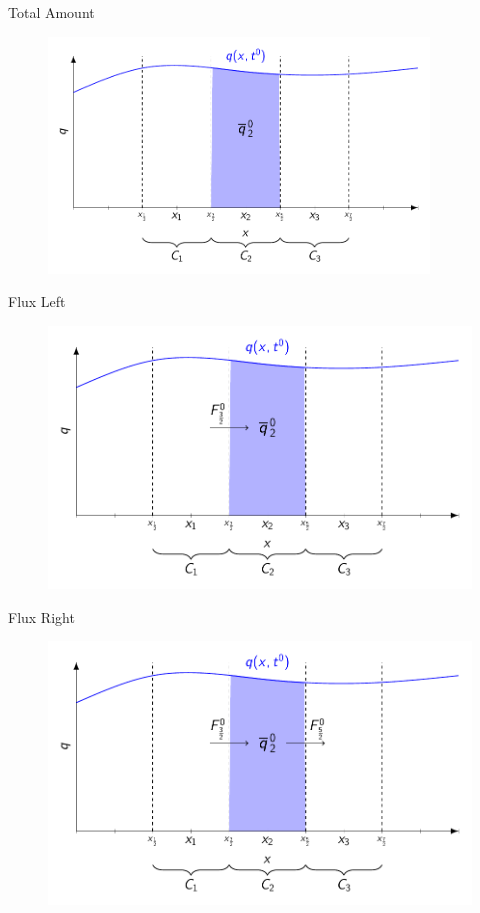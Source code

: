 \documentclass[]{beamer}
\begin{document}
\begin{frame}{Total Amount}
	\begin{figure}
		\includegraphics[width=0.9\textwidth]{./Pics/FVMpicture/Total.pdf}
	\end{figure}
\end{frame}
\begin{frame}{Flux Left}
	\begin{figure}
		\includegraphics[width=\textwidth]{./Pics/FVMpicture/TotalFluxIn.pdf}
	\end{figure}
\end{frame}
\begin{frame}{Flux Right}
	\begin{figure}
		\includegraphics[width=\textwidth]{./Pics/FVMpicture/TotalFluxInOut.pdf}
	\end{figure}
\end{frame}
\end{document}

